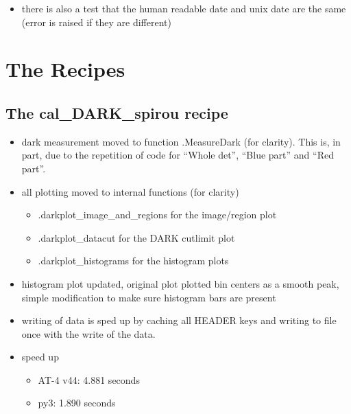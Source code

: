 \begin{itemize}
\begin{itemize}
	\item there is also a test that the human readable date and unix date are the same (error is raised if they are different)

\end{itemize}

\end{itemize}


\section{The Recipes}
\label{ch:changelog:At4:recipes}


\subsection{The cal\_DARK\_spirou recipe}
\label{ch:changelog:At4:cal_DARK_spirou}

\begin{itemize}

\item dark measurement moved to function \spirouImage.MeasureDark (for clarity). This is, in part, due to the repetition of code for ``Whole det'', ``Blue part'' and ``Red part''.

\item all plotting moved to internal functions (for clarity)
	\begin{itemize}
    \item \spirouPlot.darkplot\_image\_and\_regions for the image/region plot
    \item \spirouPlot.darkplot\_datacut for the DARK cutlimit plot
    \item \spirouPlot.darkplot\_histograms for the histogram plots 
    \end{itemize}

\item histogram plot updated, original plot plotted bin centers as a smooth peak, simple modification to make sure histogram bars are present
    
\item writing of data is sped up by caching all HEADER keys and writing to file once with the write of the data.

\item speed up
	\begin{itemize}
	\item AT-4 v44: 4.881 seconds
	\item py3: 1.890 seconds
	\end{itemize}

\end{itemize}

